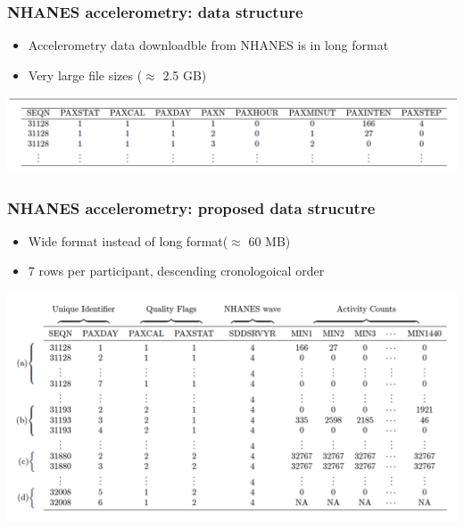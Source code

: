 \documentclass[10pt]{beamer}\usepackage[]{graphicx}\usepackage[]{color}
\begin{document}
\begin{frame}
\frametitle{NHANES accelerometry: data structure}
\begin{itemize}
\item Accelerometry data downloadble from NHANES is in long format
\item Very large file sizes ($\approx$ 2.5 GB)
\end{itemize}
\includegraphics[width=\textwidth]{accel_data_long}
\end{frame}



\begin{frame}
\frametitle{NHANES accelerometry: proposed data strucutre}
\begin{itemize}
\item Wide format instead of long format\footnotemark ($\approx$ 60 MB)
\item 7 rows per participant, descending cronologoical order
\end{itemize}
\includegraphics[width=\textwidth]{accel_data_wide}
\end{frame}
\end{document}
